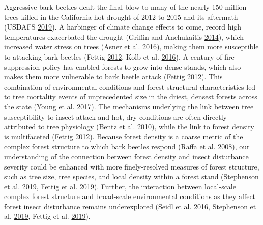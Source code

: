 \documentclass[twoside,12pt,final]{ucthesis-CA2012}
\begin{document}
\begin{ucmainmatter}
Aggressive bark beetles dealt the final blow to many of the nearly 150
million trees killed in the California hot drought of 2012 to 2015 and
its aftermath (USDAFS \protect\hyperlink{ref-usdafs2019}{2019}). A
harbinger of climate change effects to come, record high temperatures
exacerbated the drought (Griffin and Anchukaitis
\protect\hyperlink{ref-griffin2014}{2014}), which increased water stress
on trees (Asner et al. \protect\hyperlink{ref-asner2016}{2016}), making
them more susceptible to attacking bark beetles (Fettig
\protect\hyperlink{ref-fettig2012b}{2012}, Kolb et al.
\protect\hyperlink{ref-kolb2016}{2016}). A century of fire suppression
policy has enabled forests to grow into dense stands, which also makes
them more vulnerable to bark beetle attack (Fettig
\protect\hyperlink{ref-fettig2012b}{2012}). This combination of
environmental conditions and forest structural characteristics led to
tree mortality events of unprecedented size in the driest, densest
forests across the state (Young et al.
\protect\hyperlink{ref-young2017}{2017}). The mechanisms underlying the
link between tree susceptibility to insect attack and hot, dry
conditions are often directly attributed to tree physiology (Bentz et
al. \protect\hyperlink{ref-bentz2010}{2010}), while the link to forest
density is multifaceted (Fettig
\protect\hyperlink{ref-fettig2012b}{2012}). Because forest density is a
coarse metric of the complex forest structure to which bark beetles
respond (Raffa et al. \protect\hyperlink{ref-raffa2008}{2008}), our
understanding of the connection between forest density and insect
disturbance severity could be enhanced with more finely-resolved
measures of forest structure, such as tree size, tree species, and local
density within a forest stand (Stephenson et al.
\protect\hyperlink{ref-stephenson2019}{2019}, Fettig et al.
\protect\hyperlink{ref-fettig2019}{2019}). Further, the interaction
between local-scale complex forest structure and broad-scale
environmental conditions as they affect forest insect disturbance
remains underexplored (Seidl et al.
\protect\hyperlink{ref-seidl2016a}{2016}, Stephenson et al.
\protect\hyperlink{ref-stephenson2019}{2019}, Fettig et al.
\protect\hyperlink{ref-fettig2019}{2019}).


\end{ucmainmatter}
\end{document}
